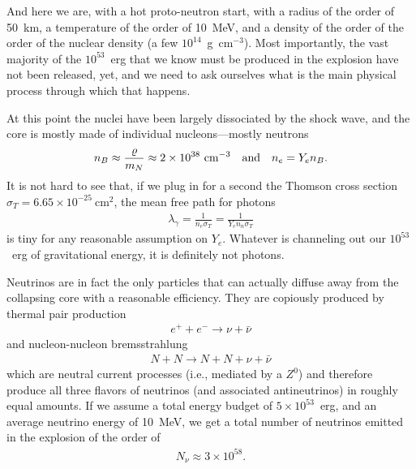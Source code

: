 And here we are, with a hot proto-neutron start, with a radius of the order of
50~km, a temperature of the order of 10~MeV, and a density of the order of the
order of the nuclear density (a few $10^{14}$~g~cm$^{-3}$). Most importantly, the vast
majority of the $10^{53}$~erg that we know must be produced in the explosion have
not been released, yet, and we need to ask ourselves what is the main physical
process through which that happens.

At this point the nuclei have been largely dissociated by the shock wave, and the
core is mostly made of individual nucleons---mostly neutrons
\begin{align*}
  n_B \approx \frac{\varrho}{m_N} \approx 2 \times 10^{38}~\text{cm}^{-3}
  \quad\text{and}\quad
  n_e = Y_e n_B.
\end{align*}
It is not hard to see that, if we plug in for a second the Thomson cross section
$\sigma_T = 6.65 \times 10^{-25}~\text{cm}^2$, the mean free path for photons
\begin{align*}
  \lambda_\gamma = \frac{1}{n_e \sigma_T} = \frac{1}{Y_e n_n \sigma_T}
\end{align*}
is tiny for any reasonable assumption on $Y_e$. Whatever is channeling
out our $10^{53}$~erg of gravitational energy, it is definitely not photons.

Neutrinos are in fact the only particles that can actually diffuse away from the
collapsing core with a reasonable efficiency. They are copiously produced
by thermal pair production
\begin{align*}
  e^+ + e^- \rightarrow \nu + \bar{\nu}
\end{align*}
and nucleon-nucleon bremsstrahlung
\begin{align*}
  N + N \rightarrow N + N + \nu + \bar{\nu}
\end{align*}
which are neutral current processes (i.e., mediated by a $Z^0$) and therefore
produce all three flavors of neutrinos (and associated antineutrinos) in roughly
equal amounts.
If we assume a total energy budget of $5 \times 10^{53}$~erg, and an average
neutrino energy of 10~MeV, we get a total number of neutrinos emitted in the
explosion of the order of
\begin{align*}
  N_\nu \approx 3 \times 10^{58}.
\end{align*}

